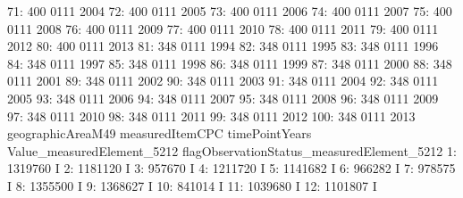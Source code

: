 \documentclass[nojss]{jss}
\begin{document}
\begin{Schunk}
\begin{Soutput}
 71:               400            0111           2004
 72:               400            0111           2005
 73:               400            0111           2006
 74:               400            0111           2007
 75:               400            0111           2008
 76:               400            0111           2009
 77:               400            0111           2010
 78:               400            0111           2011
 79:               400            0111           2012
 80:               400            0111           2013
 81:               348            0111           1994
 82:               348            0111           1995
 83:               348            0111           1996
 84:               348            0111           1997
 85:               348            0111           1998
 86:               348            0111           1999
 87:               348            0111           2000
 88:               348            0111           2001
 89:               348            0111           2002
 90:               348            0111           2003
 91:               348            0111           2004
 92:               348            0111           2005
 93:               348            0111           2006
 94:               348            0111           2007
 95:               348            0111           2008
 96:               348            0111           2009
 97:               348            0111           2010
 98:               348            0111           2011
 99:               348            0111           2012
100:               348            0111           2013
     geographicAreaM49 measuredItemCPC timePointYears
     Value_measuredElement_5212 flagObservationStatus_measuredElement_5212
  1:                    1319760                                          I
  2:                    1181120                                          I
  3:                     957670                                          I
  4:                    1211720                                          I
  5:                    1141682                                          I
  6:                     966282                                          I
  7:                     978575                                          I
  8:                    1355500                                          I
  9:                    1368627                                          I
 10:                     841014                                          I
 11:                    1039680                                          I
 12:                    1101807                                          I

\end{Soutput}
\end{Schunk}
\end{document}
